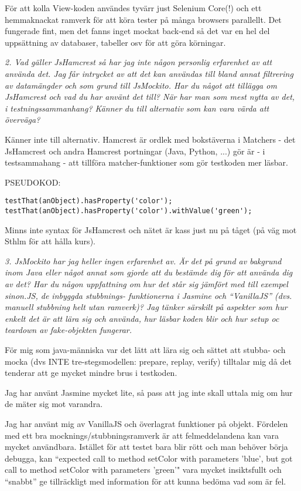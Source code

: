 \documentclass[11pt]{article}
\begin{document}
För att kolla View-koden användes tyvärr just Selenium Core(!) och ett
hemmaknackat ramverk för att köra tester på många browsers parallellt.
Det fungerade fint, men det fanns inget mockat back-end så det var en
hel del uppsättning av databaser, tabeller osv för att göra körningar.

\emph{2. Vad gäller JsHamcrest så har jag inte någon personlig erfarenhet av
att använda det. Jag får intrycket av att det kan användas till bland
annat filtrering av datamängder och som grund till JsMockito. Har du
något att tillägga om JsHamcrest och vad du har använt det till? När
har man som mest nytta av det, i testningssammanhang? Känner du till
alternativ som kan vara värda att överväga?}

Känner inte till alternativ. Hamcrest är ordlek med bokstäverna i
Matchers - det JsHamcrest och andra Hamcrest portningar (Java,
Python, ...) gör är - i testsammahang - att tillföra matcher-funktioner
som gör testkoden mer läsbar.

PSEUDOKOD:
\begin{verbatim}
testThat(anObject).hasProperty('color');
testThat(anObject).hasProperty('color').withValue('green');
\end{verbatim}

Minns inte syntax för JsHamcrest och nätet är kass just nu på tåget (på
väg mot Sthlm för att hålla kurs).

\emph{3. JsMockito har jag heller ingen erfarenhet av. Är det på grund av
bakgrund inom Java eller något annat som gjorde att du bestämde dig
för att använda dig av det? Har du någon uppfattning om hur det står
sig jämfört med till exempel sinon.JS, de inbyggda stubbnings-
funktionerna i Jasmine och ``VanillaJS'' (dvs. manuell stubbning helt
utan ramverk)? Jag tänker särskilt på aspekter som hur enkelt det är
att lära sig och använda, hur läsbar koden blir och hur setup oc
 teardown av fake-objekten fungerar.}

För mig som java-människa var det lätt att lära sig och sättet att
stubba- och mocka (dvs INTE tre-stegsmodellen: prepare, replay, verify)
tilltalar mig då det tenderar att ge mycket mindre brus i testkoden.

Jag har använt Jasmine mycket lite, så pass att jag inte skall uttala
mig om hur de mäter sig mot varandra.

Jag har använt mig av VanillaJS och överlagrat funktioner på objekt.
Fördelen med ett bra mocknings/stubbningsramverk är att felmeddelandena
kan vara mycket användbara. Istället för att testet bara blir rött och
man behöver börja debugga, kan ``expected call to method setColor with
parameters 'blue', but got call to method setColor with parameters
'green'" vara mycket insiktsfullt och ``snabbt'' ge tillräckligt med
information för att kunna bedöma vad som är fel.
\end{document}
